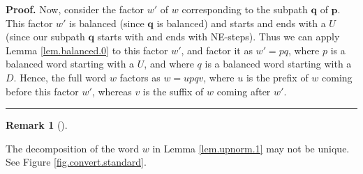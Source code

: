 \documentclass[numbers=enddot,12pt,final,onecolumn,notitlepage]{scrartcl}%
\theoremstyle{definition}
\newtheorem{remk}[theo]{Remark}
\newenvironment{remark}[1][]
{\begin{remk}[#1]\begin{leftbar}}
{\end{leftbar}\end{remk}}
\newenvironment{proof}[1][Proof]{\noindent\textbf{#1.} }{\ \rule{0.5em}{0.5em}}
\newcommand{\pp}{\mathbf{p}}
\newcommand{\qq}{\mathbf{q}}
\newenvironment{vershort}{}{}
\begin{document}
\begin{vershort}
\begin{proof}
Now, consider the factor $w'$ of $w$ corresponding to the subpath $\qq$ of $\pp$.
This factor $w'$ is balanced (since $\qq$ is balanced) and starts and ends with a $U$ (since our subpath $\qq$ starts with and ends with NE-steps). Thus we can apply Lemma \ref{lem.balanced.0} to this factor $w'$, and factor it as $w' = pq$, where $p$ is a balanced word starting with a $U$, and where $q$ is a balanced word starting with a $D$.
Hence, the full word $w$ factors as $w = upqv$, where $u$ is the prefix of $w$ coming before this factor $w'$, whereas $v$ is the suffix of $w$ coming after $w'$.
\end{proof}

\begin{remark}
The decomposition of the word $w$ in Lemma \ref{lem.upnorm.1} may not be unique. See Figure \ref{fig.convert.standard}.
\end{remark}
\end{vershort}
\end{document}
